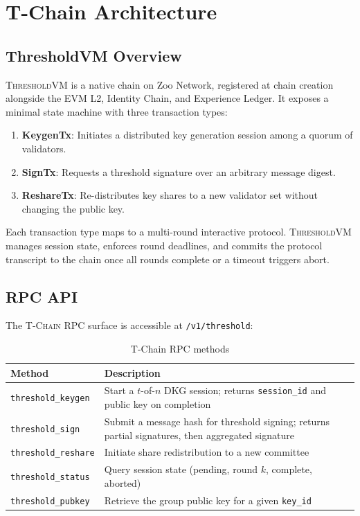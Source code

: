 \documentclass[11pt,letterpaper]{article}
\theoremstyle{definition}
\theoremstyle{remark}
\newcommand{\TChain}{\textsc{T-Chain}}
\newcommand{\ThresholdVM}{\textsc{ThresholdVM}}
\begin{document}
\section{T-Chain Architecture}
\label{sec:architecture}

\subsection{ThresholdVM Overview}

\ThresholdVM{} is a native chain on Zoo Network, registered at chain creation alongside the EVM L2, Identity Chain, and Experience Ledger. It exposes a minimal state machine with three transaction types:

\begin{enumerate}
\item \textbf{KeygenTx}: Initiates a distributed key generation session among a quorum of validators.
\item \textbf{SignTx}: Requests a threshold signature over an arbitrary message digest.
\item \textbf{ReshareTx}: Re-distributes key shares to a new validator set without changing the public key.
\end{enumerate}

Each transaction type maps to a multi-round interactive protocol. \ThresholdVM{} manages session state, enforces round deadlines, and commits the protocol transcript to the chain once all rounds complete or a timeout triggers abort.

\subsection{RPC API}

The \TChain{} RPC surface is accessible at \texttt{/v1/threshold}:

\begin{table}[h]
\centering
\begin{tabular}{lp{7cm}}
\toprule
\textbf{Method} & \textbf{Description} \\
\midrule
\texttt{threshold\_keygen} & Start a $t$-of-$n$ DKG session; returns \texttt{session\_id} and public key on completion \\
\texttt{threshold\_sign} & Submit a message hash for threshold signing; returns partial signatures, then aggregated signature \\
\texttt{threshold\_reshare} & Initiate share redistribution to a new committee \\
\texttt{threshold\_status} & Query session state (pending, round $k$, complete, aborted) \\
\texttt{threshold\_pubkey} & Retrieve the group public key for a given \texttt{key\_id} \\
\bottomrule
\end{tabular}
\caption{T-Chain RPC methods}
\label{tab:rpc}
\end{table}
\end{document}
